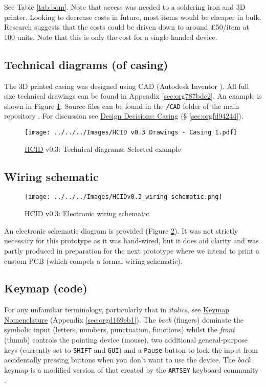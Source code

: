 \documentclass[logo,bsc,singlespacing,parskip]{infthesis}
\begin{document}
See Table \ref{tab:bom}.
Note that access was needed to a soldering iron and 3D printer.
Looking to decrease costs in future, most items would be cheaper in bulk.
Research suggests that the costs could be driven down to around £50/item at 100 units.
Note that this is only the cost for a single-handed device.
\subsection{Technical diagrams (of casing)}
\label{sec:org7fa59ce}
The 3D printed casing was designed using CAD (Autodesk Inventor \autocite{InventorSoftwareGet}).
All full size technical drawings can be found in Appendix \ref{sec:org787bdc2}.
An example is shown in Figure \ref{fig:tech_draw_ex}.
Source files can be found in the \texttt{/CAD} folder of the main repository \autocite{sharpNazzacodeHCIDMy}.
For discussion see \hyperref[sec:orgfd94244]{Design Decisions: Casing} (§ \ref{sec:orgfd94244}).

\begin{figure}[h]
\centering
\texttt{[image: ../../../Images/HCID v0.3 Drawings - Casing 1.pdf]}
\caption{\label{fig:tech_draw_ex}\hyperref[orgf95a76e]{HCID} v0.3: Technical diagrams: Selected example}
\end{figure}
\subsection{Wiring schematic}
\label{sec:org0992b32}
\begin{figure}[h]
\centering
\texttt{[image: ../../../Images/HCIDv0.3\_wiring schematic.png]}
\caption{\label{fig:wiring_schematic}\hyperref[orgf95a76e]{HCID} v0.3: Electronic wiring schematic}
\end{figure}

An electronic schematic diagram is provided (Figure \ref{fig:wiring_schematic}).
It was not strictly necessary for this prototype as it was hand-wired, but it does aid clarity and was partly produced in preparation for the next prototype where we intend to print a custom PCB (which compels a formal wiring schematic).
\subsection{Keymap (code)}
\label{sec:orga9fce1c}
For any unfamiliar terminology, particularly that in \emph{italics}, see \hyperref[sec:orgd169eb1]{Keymap Nomenclature} (Appendix \ref{sec:orgd169eb1}).
The \emph{back} (fingers) dominate the symbolic input (letters, numbers, punctuation, functions) whilst the \emph{front} (thumb) controls the pointing device (mouse), two additional general-purpose keys (currently set to \texttt{SHIFT} and \texttt{GUI}) and a \texttt{Pause} button to lock the input from accidentally pressing buttons when you don't want to use the device.
The \emph{back} keymap is a modified version of that created by the \texttt{ARTSEY} keyboard community \autocite{ARTSEYEasyFast}.
\end{document}

